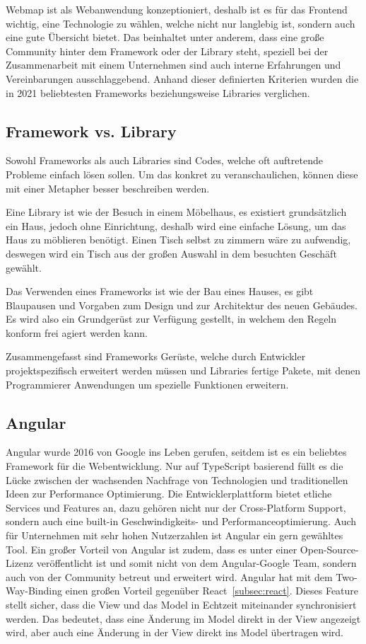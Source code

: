 Webmap ist als Webanwendung konzeptioniert, deshalb ist es für das Frontend wichtig, eine Technologie zu wählen, welche
nicht nur langlebig ist, sondern auch eine gute Übersicht bietet.
Das beinhaltet unter anderem, dass eine große Community hinter dem Framework oder der Library steht,
speziell bei der Zusammenarbeit mit einem Unternehmen sind auch interne Erfahrungen und Vereinbarungen ausschlaggebend.
Anhand dieser definierten Kriterien wurden die in 2021 beliebtesten Frameworks beziehungsweise Libraries verglichen.

\subsection{Framework vs. Library}
\label{subsec:framework-versus-library}
Sowohl Frameworks als auch Libraries sind Codes, welche oft auftretende Probleme einfach lösen sollen.
Um das konkret zu veranschaulichen, können diese mit einer Metapher besser beschreiben werden.

Eine Library ist wie der Besuch in einem Möbelhaus, es existiert grundsätzlich ein Haus, jedoch ohne Einrichtung, deshalb
wird eine einfache Lösung, um das Haus zu möblieren benötigt.
Einen Tisch selbst zu zimmern wäre zu aufwendig, deswegen wird ein Tisch aus der großen Auswahl in dem besuchten Geschäft gewählt.

Das Verwenden eines Frameworks ist wie der Bau eines Hauses, es gibt Blaupausen und Vorgaben zum Design und zur
Architektur des neuen Gebäudes.
Es wird also ein Grundgerüst zur Verfügung gestellt, in welchem den Regeln konform frei agiert werden kann.

Zusammengefasst sind Frameworks Gerüste, welche durch Entwickler projektspezifisch erweitert werden müssen und Libraries
fertige Pakete, mit denen Programmierer Anwendungen um spezielle Funktionen erweitern.

\subsection{Angular}
\label{subsec:angular}
Angular wurde 2016 von Google ins Leben gerufen, seitdem ist es ein beliebtes Framework für die Webentwicklung.
Nur auf TypeScript basierend füllt es die Lücke zwischen der wachsenden Nachfrage von Technologien und traditionellen
Ideen zur Performance Optimierung.
Die Entwicklerplattform bietet etliche Services und Features an, dazu gehören nicht nur der Cross-Platform Support,
sondern auch eine built-in Geschwindigkeits- und Performanceoptimierung.
Auch für Unternehmen mit sehr hohen Nutzerzahlen ist Angular ein gern gewähltes Tool.
Ein großer Vorteil von Angular ist zudem, dass es unter einer Open-Source-Lizenz veröffentlicht
ist und somit nicht von dem Angular-Google Team, sondern auch von der Community betreut und erweitert wird.
Angular hat mit dem Two-Way-Binding einen großen Vorteil gegenüber React~\ref{subsec:react}.
Dieses Feature stellt sicher, dass die View und das Model in Echtzeit miteinander synchronisiert werden.
Das bedeutet, dass eine Änderung im Model direkt in der View angezeigt wird, aber auch eine Änderung in der View direkt
ins Model übertragen wird.
~\cite{angular-features,what-is-angular}


